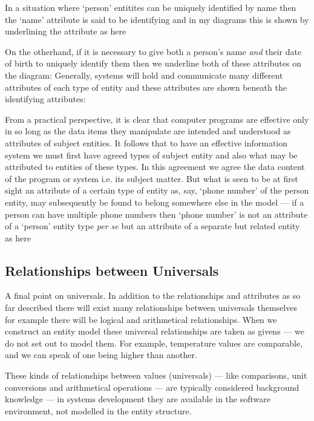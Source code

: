 \mynote
In a situation where `person' entitites can be uniquely identified by name 
then the `name' attribute is said to be identifying 
and in my diagrams this is shown by underlining the attribute as here	

On the otherhand, if it is necessary to give both a person's name \textit{and} their date of birth to uniquely identify 
them  then we underline
both of these attributes on the diagram:
Generally, systems will hold and communicate many different attributes of each type of entity and
these attributes are shown beneath the identifying attributes:

\mynote 
From a practical perspective, 
it is clear that computer programs are effective only in so long as the data items 
they manipulate are intended and understood as attributes of subject entities. It 
follows that to have an effective information system we must first have agreed types 
of subject entity and also what may be attributed to entities  of these types. 
In this agreement we agree the data content of the program or system i.e.  
its subject matter. 
But what is seen to be at first sight an attribute of a certain type of entity
as, say, `phone number' of the person entity,  may
subsequently be found to belong somewhere else in the model  ---   if a person can have multiple phone numbers then ‘phone number’ is 
not an attribute  of a ‘person’ entity type \textit{per se} but an attribute of a 
separate but related entity as here 


\subsection{Relationships between Universals}
\mynote A final point on universals. In addition to the relationships and attributes as so far described there will exist many relationships between universals themselves
for example there will be logical and arithmetical relationships. When we construct an entity model these universal relationships are taken as givens --- we do not set out to model them.
For example, temperature values are comparable, and we can speak of one being higher than another.

 These kinds of relationships between values (universals) — like comparisons, unit conversions and arithmetical operations 
 — are typically considered background knowledge --- in systems development they
 are available in the software environment, not modelled in the entity structure. 

